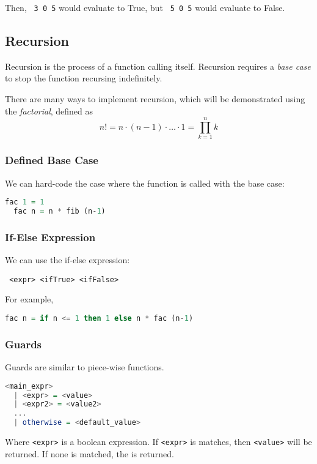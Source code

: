 Then, \texttt{ 3 0 5} would evaluate to True, but \texttt{ 5 0 5} would evaluate to False.

\subsection{Recursion}
Recursion is the process of a function calling itself. Recursion requires a \textit{base case} to stop the function recursing indefinitely.

There are many ways to implement recursion, which will be demonstrated using the \textit{factorial}, defined as
\[n! = n \cdot (n - 1) \cdot \ldots \cdot 1 = \prod_{k = 1}^{n} k\]

\subsubsection{Defined Base Case}
We can hard-code the case where the function is called with the base case:

\begin{lstlisting}[language=haskell]
  fac 1 = 1
  fac n = n * fib (n-1) 
\end{lstlisting}

\subsubsection{If-Else Expression}
We can use the if-else expression:

\begin{center}
  \texttt{ <expr>  <ifTrue>  <ifFalse>}
\end{center}

For example,

\begin{lstlisting}[language=haskell]
  fac n = if n <= 1 then 1 else n * fac (n-1)
\end{lstlisting}

\subsubsection{Guards}
Guards are similar to piece-wise functions.

\begin{lstlisting}[language=haskell]
<main_expr>
  | <expr> = <value>
  | <expr2> = <value2>
  ...
  | otherwise = <default_value>
\end{lstlisting}
Where \texttt{<expr>} is a boolean expression. If \texttt{<expr>} is matches, then \texttt{<value>} will be returned. If none is matched, the \texttt{} is returned.


